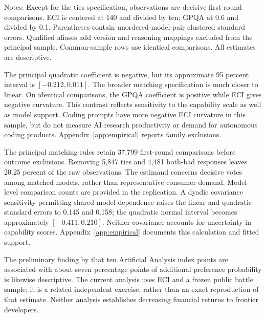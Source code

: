 \begin{table}[htbp]\centering\small
\caption{Preferences over measured capability}\label{tab:preferences}
\resizebox{\textwidth}{!}{}
\begin{minipage}{\textwidth}\footnotesize\vspace{0.4em}
Notes: Except for the ties specification, observations are decisive first-round comparisons. ECI is centered at 140 and divided by ten; GPQA at 0.6 and divided by 0.1. Parentheses contain unordered-model-pair clustered standard errors. Qualified aliases add version and reasoning mappings excluded from the principal sample. Common-sample rows use identical comparisons. All estimates are descriptive.
\end{minipage}
\end{table}

The principal quadratic coefficient is negative, but its approximate 95 percent interval is $[-0.212,0.011]$. The broader matching specification is much closer to linear. On identical comparisons, the GPQA coefficient is positive while ECI gives negative curvature. This contrast reflects sensitivity to the capability scale as well as model support. Coding prompts have more negative ECI curvature in this sample, but do not measure AI research productivity or demand for autonomous coding products. Appendix~\ref{app:empirical} reports family exclusions.

The principal matching rules retain 37,799 first-round comparisons before outcome exclusions. Removing 5,847 ties and 4,481 both-bad responses leaves 20.25 percent of the raw observations. The estimand concerns decisive votes among matched models, rather than representative consumer demand. Model-level comparison counts are provided in the replication. A dyadic covariance sensitivity permitting shared-model dependence raises the linear and quadratic standard errors to 0.145 and 0.158; the quadratic normal interval becomes approximately $[-0.411,0.210]$. Neither covariance accounts for uncertainty in capability scores. Appendix~\ref{app:empirical} documents this calculation and fitted support.

The preliminary finding by \citet{fradkin2026} that ten Artificial Analysis index points are associated with about seven percentage points of additional preference probability is likewise descriptive. The current analysis uses ECI and a frozen public battle sample; it is a related independent exercise, rather than an exact reproduction of that estimate. Neither analysis establishes decreasing financial returns to frontier developers.

